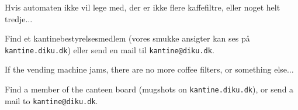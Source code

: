 \documentclass{article}
\begin{document}
\maketitle

\vspace{-0.5cm}


\vspace{-1.2cm}

\begin{center}

\LARGE

Hvis automaten ikke vil lege med, der er ikke flere kaffefiltre, eller noget
helt tredje$\ldots$\\

\Huge

Find et kantinebestyrelsesmedlem (vores smukke ansigter kan ses på
\texttt{kantine.diku.dk}) eller send en mail til
\texttt{kantine@diku.dk}.

\end{center}

\english

\vspace{-0.3cm}


\vspace{-1.2cm}

\begin{center}

\LARGE

If the vending machine jams, there are no more coffee filters, or something
else$\ldots$\\

\Huge

Find a member of the canteen board (mugshots on \texttt{kantine.diku.dk}), or
send a mail to \texttt{kantine@diku.dk}.

\end{center}

\dansk

\underskriv
\end{document}
